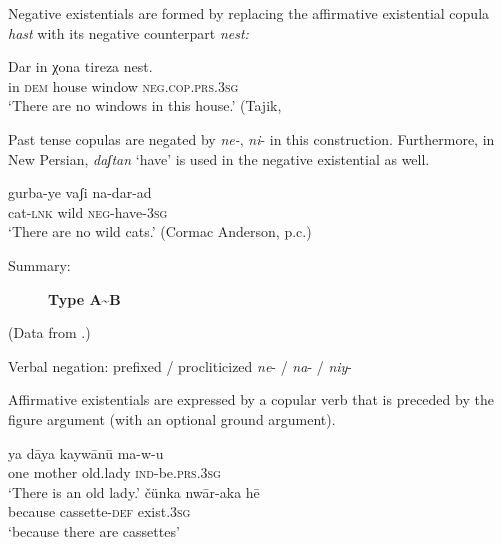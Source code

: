 \documentclass[output=paper,colorlinks,citecolor=brown]{langscibook}
\begin{document}
\begin{paperappendix}
\begin{unindented}
\let\eachwordtwo=\upshape

Negative existentials are formed by replacing the affirmative existential copula \textit{hast} with its negative counterpart \textit{nest:} 
%
\begin{exe}\ex
    \gll Dar  in       χona    tireza     nest. \\
in     \textsc{dem}   house   window \textsc{neg.cop.prs.3sg} \\
    \glt `There are no windows in this house.' (Tajik, \citealt[202]{Perry2005}
    \end{exe}

Past tense copulas are negated by \textit{ne-}, \textit{ni}- in this construction. Furthermore, in New Persian, \textit{daʃtan} `have' is used in the negative existential as well.
%
\begin{exe}\ex
    \gll gurba-ye vaʃi  na-dar-ad \\
cat-\textsc{lnk}   wild \textsc{neg}-have-\textsc{3sg} \\
    \glt `There are no wild cats.' (Cormac Anderson, p.c.)
    \end{exe}

\begin{description}
\item[Summary:] \textbf{Type A{\textasciitilde}B}
\end{description}

 (Data from \citealt{MahmoudveysiBailey2012}.)

Verbal negation: prefixed / procliticized \textit{ne}- / \textit{na}- /
\textit{niy}- \parencite[25]{MahmoudveysiBailey2012}

Affirmative existentials are expressed by a copular verb that is preceded by the figure argument (with an optional ground argument).
%
\begin{exe}\ex \gll ya   dāya    kaywānū ma-w-u \\
one mother old.lady  \textsc{ind}-be.\textsc{prs.3sg} \\
    \glt `There is an old lady.' \parencite[15]{MahmoudveysiBailey2012}
\ex \gll čünka    nwār-aka       hē \\
because cassette-\textsc{def}  exist.\textsc{3sg} \\
    \glt `because there are cassettes' \parencite[34]{MahmoudveysiBailey2012}
    \end{exe}


\end{unindented}
\end{paperappendix}
\end{document}
